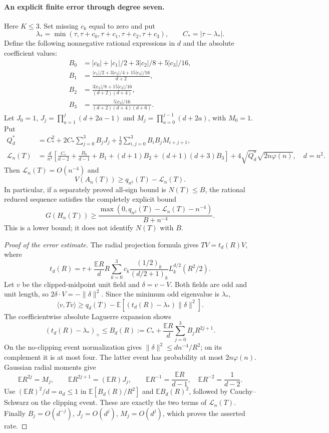 \paragraph{An explicit finite error through degree seven.}
Here $K\leq3$.  Set missing $c_k$ equal to zero and put
\[
 \lambda_*=\min(\tau,\tau+c_0,\tau+c_1,\tau+c_2,\tau+c_3),
 \qquad C_* = |\tau-\lambda_*|.
\]
Define the following nonnegative rational expressions in $d$ and
the absolute coefficient values:
\begin{align*}
 B_0&=|c_0|+|c_1|/2+3|c_2|/8+5|c_3|/16,\\
 B_1&=\frac{|c_1|/2+3|c_2|/4+15|c_3|/16}{d+2},\\
 B_2&=\frac{3|c_2|/8+15|c_3|/16}{(d+2)(d+4)},\\
 B_3&=\frac{5|c_3|/16}{(d+2)(d+4)(d+6)}.
\end{align*}
Let $J_0=1$, $J_j=\prod_{a=1}^j(d+2a-1)$ and
$M_j=\prod_{a=0}^{j-1}(d+2a)$, with $M_0=1$.  Put
\begin{align*}
 Q_d^*&=C_*^2+2C_*\sum_{j=0}^3B_jJ_j
          +\frac1d\sum_{i,j=0}^3B_iB_jM_{i+j+1},\\
 \mathcal L_n(T)&=
 \frac{d}{n^4}\left[
 \frac{C_*}{d-2}+\frac{B_0}{d-1}+B_1
 +(d+1)B_2+(d+1)(d+3)B_3\right]
       +4\sqrt{Q_d^*}\sqrt{2n\varphi(n)},\quad d=n^2.
\end{align*}
Then $\mathcal L_n(T)=O(n^{-4})$ and
\begin{equation}\label{eq:new-tail-finite-lower}
 V(A_n(T))\geq q_{n^2}(T)-\mathcal L_n(T).
\end{equation}
In particular, if a separately proved all-sign bound is $N(T)\leq B$,
the rational reduced sequence satisfies the completely explicit bound
\[
 G(H_n(T))\geq
 \frac{\max(0,q_{n^2}(T)-\mathcal L_n(T)-n^{-4})}{B+n^{-4}}.
\]
This is a lower bound; it does not identify $N(T)$ with $B$.

\begin{proof}[Proof of the error estimate]
The radial projection formula gives $TV=t_d(R)V$, where
\[
 t_d(R)=\tau+\frac{\mathbb ER}{d}R\sum_{k=0}^3
 c_k\frac{(1/2)_k}{(d/2+1)_k}L_k^{d/2}(R^2/2).
\]
Let $v$ be the clipped-midpoint unit field and $\delta=v-V$.
Both fields are odd and unit length, so
$2\delta\cdot V=-\|\delta\|^2$.  Since the minimum odd eigenvalue
is $\lambda_*$,
\[
 \langle v,Tv\rangle\geq q_d(T)
             -\mathbb E[(t_d(R)-\lambda_*)\|\delta\|^2].
\]
The coefficientwise absolute Laguerre expansion shows
\[
 (t_d(R)-\lambda_*)_+\leq
 B_d(R):=C_*+\frac{\mathbb ER}{d}
                         \sum_{j=0}^3 B_jR^{2j+1}.
\]
On the no-clipping event normalization gives
$\|\delta\|^2\leq dn^{-4}/R^2$; on its complement it is at most
four.  The latter event has probability at most $2n\varphi(n)$.
Gaussian radial moments give
\[
 \mathbb ER^{2j}=M_j,\qquad
 \mathbb ER^{2j+1}=(\mathbb ER)J_j,\qquad
 \mathbb ER^{-1}=\frac{\mathbb ER}{d-1},\quad
 \mathbb ER^{-2}=\frac1{d-2}.
\]
Use $(\mathbb ER)^2/d=a_d\leq1$ in
$\mathbb E[B_d(R)/R^2]$ and $\mathbb EB_d(R)^2$, followed by
Cauchy--Schwarz on the clipping event.  These are exactly the two
terms of $\mathcal L_n(T)$.  Finally $B_j=O(d^{-j})$, $J_j=O(d^j)$,
$M_j=O(d^j)$, which proves the asserted rate.
\end{proof}

